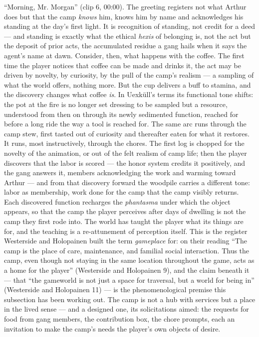 ``Morning, Mr. Morgan'' (clip 6, 00:00). The greeting registers not what Arthur does but that the camp \textit{knows} him, knows him by name and acknowledges his standing at the day's first light. It is recognition of standing, not credit for a deed — and standing is exactly what the ethical \textit{hexis} of belonging is, not the act but the deposit of prior acts, the accumulated residue a gang hails when it says the agent's name at dawn. Consider, then, what happens with the coffee. The first time the player notices that coffee can be made and drinks it, the act may be driven by novelty, by curiosity, by the pull of the camp's realism — a sampling of what the world offers, nothing more. But the cup delivers a buff to stamina, and the discovery changes what coffee \textit{is}. In Uexküll's terms its functional tone shifts: the pot at the fire is no longer set dressing to be sampled but a resource, understood from then on through its newly sedimented function, reached for before a long ride the way a tool is reached for. The same arc runs through the camp stew, first tasted out of curiosity and thereafter eaten for what it restores. It runs, most instructively, through the chores. The first log is chopped for the novelty of the animation, or out of the felt realism of camp life; then the player discovers that the labor is scored — the honor system credits it positively, and the gang answers it, members acknowledging the work and warming toward Arthur — and from that discovery forward the woodpile carries a different tone: labor as membership, work done for the camp that the camp visibly returns. Each discovered function recharges the \textit{phantasma} under which the object appears, so that the camp the player perceives after days of dwelling is not the camp they first rode into. The world has taught the player what its things are for, and the teaching is a re-attunement of perception itself.
This is the register Westerside and Holopainen built the term \textit{gameplace} for: on their reading ``The camp is the place of care, maintenance, and familial social interaction. Thus the camp, even though not staying in the same location throughout the game, acts as a home for the player'' (Westerside and Holopainen 9), and the claim beneath it — that ``the gameworld is not just a space for traversal, but a world for being in'' (Westerside and Holopainen 11) — is the phenomenological premise this subsection has been working out. The camp is not a hub with services but a place in the lived sense — and a designed one, its solicitations aimed: the requests for food from gang members, the contribution box, the chore prompts, each an invitation to make the camp's needs the player's own objects of desire.

